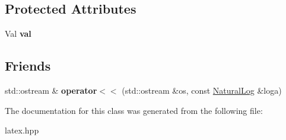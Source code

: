 \subsection*{Protected Attributes}
\begin{DoxyCompactItemize}
\item 
\hypertarget{classlatex_1_1math_1_1NaturalLog_a46cee76970936d26daf87e8c3ec4c47b}{Val {\bfseries val}}\label{classlatex_1_1math_1_1NaturalLog_a46cee76970936d26daf87e8c3ec4c47b}

\end{DoxyCompactItemize}
\subsection*{Friends}
\begin{DoxyCompactItemize}
\item 
\hypertarget{classlatex_1_1math_1_1NaturalLog_a5151466531baf2bea2fc1928e34cb084}{std\-::ostream \& {\bfseries operator$<$$<$} (std\-::ostream \&os, const \hyperlink{classlatex_1_1math_1_1NaturalLog}{Natural\-Log} \&loga)}\label{classlatex_1_1math_1_1NaturalLog_a5151466531baf2bea2fc1928e34cb084}

\end{DoxyCompactItemize}


The documentation for this class was generated from the following file\-:\begin{DoxyCompactItemize}
\item 
latex.\-hpp\end{DoxyCompactItemize}
